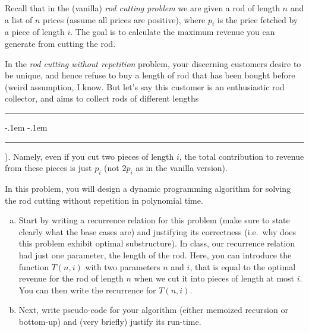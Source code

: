 \documentclass[11pt]{article}
\begin{document}
    \newpage

    \begin{tcolorbox}[title={Problem 2 (Rod Cutting without Repetition, 30 pts)}] \setlength\parindent{1em}
    
    Recall that in the (vanilla) \emph{rod cutting problem} we are given a rod of length $n$ and a list of $n$ prices (assume all prices are positive), where $p_i$ is the price fetched by a piece of length $i$. The goal is to calculate the maximum revenue you can generate from cutting the rod.

    \vspace{1em}
    
    In the \emph{rod cutting without repetition} problem, your discerning customers desire to be unique, and hence refuse to buy a length of rod that has been bought before (weird assumption, I know. But let's say this customer is an enthusiastic rod collector, and aims to collect rods of different lengths \rule[1.3ex]{.25em}{1pt}\kern-.1em%
    \kern-.1em\rule[-.2ex]{.4em}{1pt}%
    ). Namely, even if you cut two pieces of length $i$, the total contribution to revenue from these pieces is just $p_i$ (not $2p_i$ as in the vanilla version).

    \vspace{1em}
    
    In this problem, you will design a dynamic programming algorithm for solving the rod cutting without repetition in polynomial time. 
    
    \begin{enumerate}[(a)]
    \item  Start by writing a recurrence relation for this problem (make sure to state clearly what the base cases are) and justifying its correctness (i.e.~why does this problem exhibit optimal substructure). In class, our recurrence relation had just one parameter, the length of the rod. Here, you can introduce the function $T(n,i)$ with two parameters $n$ and $i$, that is equal to the optimal revenue for the rod of length $n$ when we cut it into pieces of length at most $i$. You can then write the recurrence for $T(n,i)$.
    \item Next, write pseudo-code for your algorithm (either memoized recursion or bottom-up) and (very briefly) justify its run-time.
    \end{enumerate}
    \end{tcolorbox}
\end{document}
